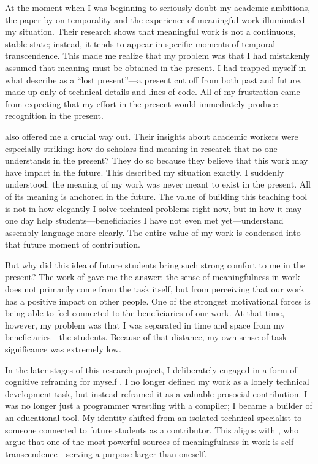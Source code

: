 \documentclass[12pt,a4paper]{article}
\begin{document}
At the moment when I was beginning to seriously doubt my academic ambitions, the paper by \citet{Bailey2017TimeReclaimed} on temporality and the experience of meaningful work illuminated my situation. Their research shows that meaningful work is not a continuous, stable state; instead, it tends to appear in specific moments of temporal transcendence. This made me realize that my problem was that I had mistakenly assumed that meaning must be obtained in the present. I had trapped myself in what \citet{Bailey2017TimeReclaimed} describe as a ``lost present''---a present cut off from both past and future, made up only of technical details and lines of code. All of my frustration came from expecting that my effort in the present would immediately produce recognition in the present.

\citet{Bailey2017TimeReclaimed} also offered me a crucial way out. Their insights about academic workers were especially striking: how do scholars find meaning in research that no one understands in the present? They do so because they believe that this work may have impact in the future. This described my situation exactly. I suddenly understood: the meaning of my work was never meant to exist in the present. All of its meaning is anchored in the future. The value of building this teaching tool is not in how elegantly I solve technical problems right now, but in how it may one day help students---beneficiaries I have not even met yet---understand assembly language more clearly. The entire value of my work is condensed into that future moment of contribution.

But why did this idea of future students bring such strong comfort to me in the present? The work of \citet{Grant2007RelationalJobDesign,Grant2008TaskSignificance} gave me the answer: the sense of meaningfulness in work does not primarily come from the task itself, but from perceiving that our work has a positive impact on other people. One of the strongest motivational forces is being able to feel connected to the beneficiaries of our work. At that time, however, my problem was that I was separated in time and space from my beneficiaries---the students. Because of that distance, my own sense of task significance was extremely low.

In the later stages of this research project, I deliberately engaged in a form of cognitive reframing for myself \citep{Wrzesniewski2001JobCrafting}. I no longer defined my work as a lonely technical development task, but instead reframed it as a valuable prosocial contribution. I was no longer just a programmer wrestling with a compiler; I became a builder of an educational tool. My identity shifted from an isolated technical specialist to someone connected to future students as a contributor. This aligns with \citet{Rosso2010MeaningOfWork}, who argue that one of the most powerful sources of meaningfulness in work is self-transcendence---serving a purpose larger than oneself.
\end{document}
